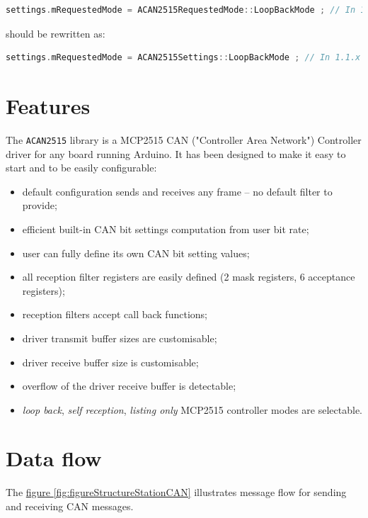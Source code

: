 \documentclass[9pt, a4paper, obeyspaces]{extarticle}
\newcommand\refFigure[2]{\hyperref[fig:#2]{figure \ref*{fig:#2}{\ifthenelse{\equal{#1}{}}{}{.#1}}}}
\begin{document}
{ \small\begin{lstlisting}[language=c++]
  settings.mRequestedMode = ACAN2515RequestedMode::LoopBackMode ; // In 1.0.x
\end{lstlisting}}

should be rewritten as:
{ \small\begin{lstlisting}[language=c++]
  settings.mRequestedMode = ACAN2515Settings::LoopBackMode ; // In 1.1.x
\end{lstlisting}}



\section{Features}

The \texttt{ACAN2515} library is a MCP2515 CAN ("Controller Area Network") Controller driver for any board running Arduino. It has been designed to make it easy to start and to be easily configurable:
\begin{itemize}
  \item default configuration sends and receives any frame -- no default filter to provide;
  \item efficient built-in CAN bit settings computation from user bit rate;
  \item user can fully define its own CAN bit setting values;
  \item all reception filter registers are easily defined (2 mask registers, 6 acceptance registers);
  \item reception filters accept call back functions;
  \item driver transmit buffer sizes are customisable;
  \item driver receive buffer size is customisable;
  \item overflow of the driver receive buffer is detectable;
  \item \emph{loop back}, \emph{self reception}, \emph{listing only} MCP2515 controller modes are selectable.
\end{itemize}



\section{Data flow}

The \refFigure{}{figureStructureStationCAN} illustrates message flow for sending and receiving CAN messages.
\end{document}
